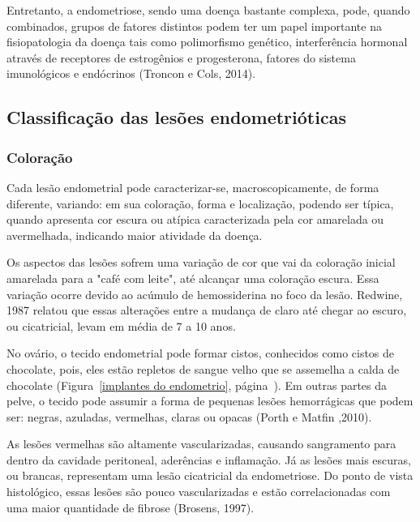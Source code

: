\documentclass[12pt]{article} %
\begin{document}
Entretanto, a endometriose, sendo uma doença bastante complexa, pode,
quando combinados, grupos de fatores distintos podem ter um papel
importante na fisiopatologia da doença tais como polimorfismo
genético, interferência hormonal através de receptores de estrogênios
e progesterona, fatores do sistema imunológicos e endócrinos (Troncon
e Cols, 2014).

\subsection{Classificação das lesões endometrióticas}

\subsubsection{Coloração}

Cada lesão endometrial pode caracterizar-se, macroscopicamente, de forma
diferente, variando: em sua coloração, forma e localização,
podendo ser típica, quando apresenta cor escura ou atípica
caracterizada pela cor amarelada ou avermelhada, indicando maior
atividade da doença.

Os aspectos das lesões sofrem uma variação de cor que vai da coloração
inicial amarelada para a "café com leite", até alcançar uma coloração
escura. Essa variação ocorre devido ao acúmulo de hemossiderina no
foco da lesão. Redwine, 1987 relatou que essas alterações entre a
mudança de claro até chegar ao escuro, ou cicatricial, levam em média
de 7 a 10 anos.

No ovário, o tecido endometrial pode formar cistos, conhecidos como
cistos de chocolate, pois, eles estão repletos de sangue velho que se
assemelha a calda de chocolate (Figura~\ref{implantes do endometrio},
página~\pageref{implantes do endometrio}). Em outras partes da pelve,
o tecido pode assumir a forma de pequenas lesões hemorrágicas que
podem ser: negras, azuladas, vermelhas, claras ou opacas (Porth e
Matfin ,2010).

As lesões vermelhas são altamente vascularizadas, causando sangramento
para dentro da cavidade peritoneal, aderências e inflamação. Já as
lesões mais escuras, ou brancas, representam uma lesão cicatricial
da endometriose. Do ponto de vista histológico, essas lesões são pouco
vascularizadas e estão correlacionadas com uma maior quantidade de
fibrose (Brosens, 1997).
\end{document}
